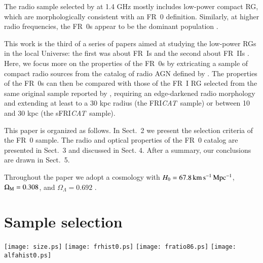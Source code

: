 \documentclass[traditabstract]{aa}
\newcommand{\FR}{FRI{\sl{CAT}}}\newcommand{\FRII}{FRII{\sl{CAT}}}
\newcommand{\FRo}{FR0{\sl{CAT}}}
\newcommand{\sFR}{sFRI{\sl{CAT}}}
\begin{document}
The radio sample selected by \citet{best05b} at 1.4 GHz mostly includes
low-power compact RG, which are morphologically consistent with an FR~0
definition. Similarly, at higher radio frequencies, the FR~0s appear
to be the dominant population \citep{sadler14,whittam16,whittam17}.

This work is the third of a series of papers aimed at studying the
low-power RGs in the local Universe: the first was about FR~Is
\citep{capetti17a} and the second about FR~IIs
\citep{capetti17b}. Here, we focus more on the properties of
the FR~0s by extricating a sample of compact radio sources from the
catalog of radio AGN defined by \citet{best12}. The properties of
  the FR~0s can then be compared with those of the FR~I RG
  selected from the same original sample reported by \citet{capetti17a},
  requiring an edge-darkened radio morphology and extending at least
  to a 30 kpc radius (the \FR\ sample) or between 10 and 30 kpc (the
  \sFR\ sample).

This paper is organized as follows. In Sect.\ 2 we present the
selection criteria of the FR~0 sample. The radio and optical
properties of the FR~0 catalog are presented in Sect.\ 3 and discussed
in Sect. 4. After a summary, our conclusions are drawn in Sect.\ 5.

Throughout the paper we adopt a cosmology with $H_0=67.8 \, \rm km \, s^{-1} \,
Mpc^{-1}$, $\Omega_{\rm M}=0.308$, and $\Omega_\Lambda=0.692$ \citep{ade16}.  
\section{Sample selection}
\label{sample}

\begin{figure*}
\texttt{[image: size.ps]}
\texttt{[image: frhist0.ps]}
\texttt{[image: fratio86.ps]}
\texttt{[image: alfahist0.ps]}
\caption{Top left panel: measured major axis (FWHM) in arcsec versus the FIRST
  flux density for sources that do not show clearly resolved radio
  emission; the red dashed line marks the adopted limit of 6
  for the inclusion in the \FRo\ sample. Top right panel: distribution of
  the NVSS fluxes (left) of the 108 \FRo\ (blue), the 219 \FR\
  (black), and the 14 \sFR\ sources (red). The vertical dotted line
  marks the 5 mJy limits of the BH12 sample. Bottom left panel: ratio
  between the FIRST and NVSS fluxes versus the NVSS flux density for
  the \FRo\ sources; the dashed curve indicates the upper
    boundary of the region in which objects are located that pass the NVSS flux
    threshold, but were not selected due to the 5 mJy minimum FIRST flux
    requirement because of a large contribution of
    resolved emission.  Bottom right panel: radio
  spectral index between 327 and 1400 MHz; the dashed cyan histogram
  represents the upper limits.}
\label{hist}
\end{figure*}
\end{document}
